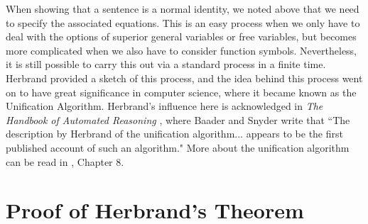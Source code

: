 \documentclass[a4paper,12pt]{report}
\theoremstyle{definition}
\begin{document}
\label{unif} When showing that a sentence is a normal identity, we noted above that we need to specify the associated equations. This is an easy process when we only have to deal with the options of superior general variables or free variables, but becomes more complicated when we also have to consider function symbols. Nevertheless, it is still possible to carry this out via a standard process in a finite time. Herbrand provided a sketch of this process, and the idea behind this process went on to have great significance in computer science, where it became known as the Unification Algorithm. Herbrand's influence here is acknowledged in \emph{The Handbook of Automated Reasoning} \cite{Handbook reasoning}, where Baader and Snyder write that ``The description by Herbrand of the unification algorithm...  appears to be the first published account of such an algorithm." More about the unification algorithm can be read in \cite{Handbook reasoning}, Chapter 8.

\section{Proof of Herbrand's Theorem}
\label{sec:proof}
\end{document}
